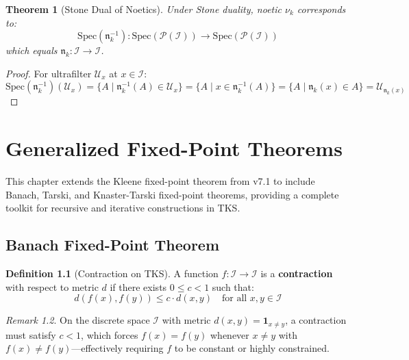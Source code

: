 \documentclass[11pt,twoside,openright]{book}
\theoremstyle{definition}
\newtheorem{definition}{Definition}[chapter]
\theoremstyle{plain}
\newtheorem{theorem}[definition]{Theorem}
\theoremstyle{remark}
\newtheorem{remark}[definition]{Remark}
\newcommand{\Ideas}{\mathcal{I}}
\newcommand{\noe}[1]{\nu_{#1}}
\newcommand{\Spec}{\mathrm{Spec}}            %
\newcommand{\vnewtwo}{\textbf{v7.2 New}}
\begin{document}
\begin{theorem}[Stone Dual of Noetics]
\label{thm:stone-dual-noetics}
Under Stone duality, noetic $\noe{k}$ corresponds to:
\[
\Spec(\mathfrak{n}_k^{-1}) : \Spec(\mathcal{P}(\Ideas)) \to \Spec(\mathcal{P}(\Ideas))
\]
which equals $\mathfrak{n}_k : \Ideas \to \Ideas$.
\end{theorem}

\begin{proof}
For ultrafilter $\mathcal{U}_x$ at $x \in \Ideas$:
\[
\Spec(\mathfrak{n}_k^{-1})(\mathcal{U}_x) = \{A \mid \mathfrak{n}_k^{-1}(A) \in \mathcal{U}_x\} = \{A \mid x \in \mathfrak{n}_k^{-1}(A)\} = \{A \mid \mathfrak{n}_k(x) \in A\} = \mathcal{U}_{\mathfrak{n}_k(x)}
\]
\end{proof}


\chapter{Generalized Fixed-Point Theorems}
\label{ch:fixed-points}

\begin{tcolorbox}[colback=blue!5!white,colframe=blue!75!black,title=\vnewtwo]
This chapter extends the Kleene fixed-point theorem from v7.1 to include Banach, Tarski, and Knaster-Tarski fixed-point theorems, providing a complete toolkit for recursive and iterative constructions in TKS.
\end{tcolorbox}

\section{Banach Fixed-Point Theorem}

\begin{definition}[Contraction on TKS]
\label{def:contraction}
A function $f : \Ideas \to \Ideas$ is a \textbf{contraction} with respect to metric $d$ if there exists $0 \leq c < 1$ such that:
\[
d(f(x), f(y)) \leq c \cdot d(x, y) \quad \text{for all } x, y \in \Ideas
\]
\end{definition}

\begin{remark}
On the discrete space $\Ideas$ with metric $d(x,y) = \mathbf{1}_{x \neq y}$, a contraction must satisfy $c < 1$, which forces $f(x) = f(y)$ whenever $x \neq y$ with $f(x) \neq f(y)$---effectively requiring $f$ to be constant or highly constrained.
\end{remark}
\end{document}
